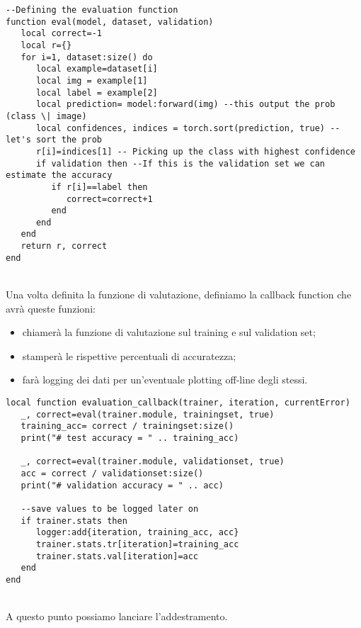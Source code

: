 \begin{lstlisting}[language={[5.2]Lua}]
--Defining the evaluation function
function eval(model, dataset, validation)
   local correct=-1
   local r={}
   for i=1, dataset:size() do
      local example=dataset[i]
      local img = example[1]
      local label = example[2]
      local prediction= model:forward(img) --this output the prob (class \| image)
      local confidences, indices = torch.sort(prediction, true) -- let's sort the prob
      r[i]=indices[1] -- Picking up the class with highest confidence
      if validation then --If this is the validation set we can estimate the accuracy
         if r[i]==label then
            correct=correct+1
         end
      end
   end
   return r, correct
end
\end{lstlisting}
\\
\newpage
Una volta definita la funzione di valutazione, definiamo la callback function che avrà queste funzioni: 
\begin{itemize}
\item chiamerà la funzione di valutazione sul training e sul validation set; 
\item stamperà le rispettive percentuali di accuratezza; 
\item farà logging dei dati per un'eventuale plotting off-line degli stessi.
\end{itemize} 

\begin{lstlisting}[language={[5.2]Lua}]
local function evaluation_callback(trainer, iteration, currentError)
   _, correct=eval(trainer.module, trainingset, true)
   training_acc= correct / trainingset:size()
   print("# test accuracy = " .. training_acc)

   _, correct=eval(trainer.module, validationset, true)
   acc = correct / validationset:size()
   print("# validation accuracy = " .. acc)

   --save values to be logged later on
   if trainer.stats then
      logger:add{iteration, training_acc, acc}
      trainer.stats.tr[iteration]=training_acc
      trainer.stats.val[iteration]=acc
   end
end
\end{lstlisting}
\\
A questo punto possiamo lanciare l'addestramento.

